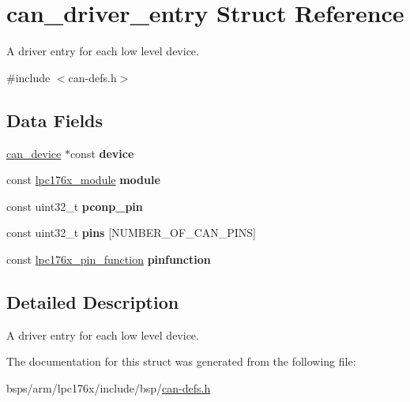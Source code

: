 \hypertarget{structcan__driver__entry}{}\section{can\+\_\+driver\+\_\+entry Struct Reference}
\label{structcan__driver__entry}


A driver entry for each low level device.  




{\ttfamily \#include $<$can-\/defs.\+h$>$}

\subsection*{Data Fields}
\begin{DoxyCompactItemize}
\item 
\mbox{\label{structcan__driver__entry_aa32e7ba982b99484b84c8e8b9518d1ea}} 
\mbox{\hyperlink{structcan__device}{can\+\_\+device}} $\ast$const {\bfseries device}
\item 
\mbox{\label{structcan__driver__entry_a361664ee65cf94020ff556ea5dfde60a}} 
const \mbox{\hyperlink{common-types_8h_a7183a9a227854e33c20d9153adf747cb}{lpc176x\+\_\+module}} {\bfseries module}
\item 
\mbox{\label{structcan__driver__entry_ac3668788751760754e0215d781737da7}} 
const uint32\+\_\+t {\bfseries pconp\+\_\+pin}
\item 
\mbox{\label{structcan__driver__entry_a10dde4488be817e820e3152c4c8c50ff}} 
const uint32\+\_\+t {\bfseries pins} \mbox{[}N\+U\+M\+B\+E\+R\+\_\+\+O\+F\+\_\+\+C\+A\+N\+\_\+\+P\+I\+NS\mbox{]}
\item 
\mbox{\label{structcan__driver__entry_aa9c6913bc335095f69ab6dc0439e57a3}} 
const \mbox{\hyperlink{io-defs_8h_a93321e597449441e81f45118a89a304e}{lpc176x\+\_\+pin\+\_\+function}} {\bfseries pinfunction}
\end{DoxyCompactItemize}


\subsection{Detailed Description}
A driver entry for each low level device. 

The documentation for this struct was generated from the following file\+:\begin{DoxyCompactItemize}
\item 
bsps/arm/lpc176x/include/bsp/\mbox{\hyperlink{can-defs_8h}{can-\/defs.\+h}}\end{DoxyCompactItemize}
